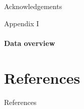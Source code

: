 \documentclass[xcolor={dvipsnames,table},12pt]{beamer}
\newif\ifplacelogo{}  %
\begin{document}
\begin{frame}{Acknowledgements}
    \
    \\
    {\scriptsize }
\end{frame}

\placelogofalse{}
\begin{frame}{Appendix I}
    \framesubtitle{Data overview}
    {
        \tiny
        
    }
\end{frame}
\placelogotrue{}

\section*{References}
\begin{frame}[allowframebreaks]{References}
    \AtNextBibliography{\scriptsize}
    \printbibliography[category=cited]
\end{frame}
\end{document}

